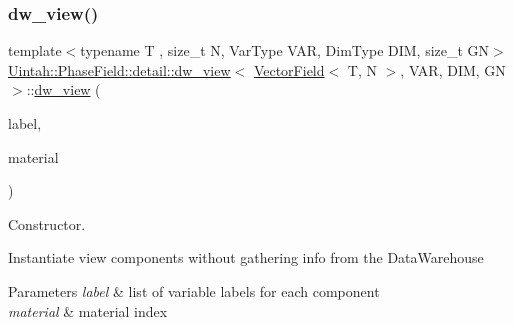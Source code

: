 \subsubsection{\texorpdfstring{dw\+\_\+view()}{dw\_view()}\hspace{0.1cm}{\footnotesize\ttfamily [1/3]}}
{\footnotesize\ttfamily template$<$typename T , size\+\_\+t N, Var\+Type V\+AR, Dim\+Type D\+IM, size\+\_\+t GN$>$ \\
\hyperlink{classUintah_1_1PhaseField_1_1detail_1_1dw__view}{Uintah\+::\+Phase\+Field\+::detail\+::dw\+\_\+view}$<$ \hyperlink{structUintah_1_1PhaseField_1_1VectorField}{Vector\+Field}$<$ T, N $>$, V\+AR, D\+IM, GN $>$\+::\hyperlink{classUintah_1_1PhaseField_1_1detail_1_1dw__view}{dw\+\_\+view} (\begin{DoxyParamCaption}\item[{const typename \hyperlink{structUintah_1_1PhaseField_1_1VectorField_a59698346336d8cdfdf767367839f2be9}{Field\+::label\+\_\+type} \&}]{label,  }\item[{int}]{material }\end{DoxyParamCaption})\hspace{0.3cm}{\ttfamily [inline]}}



Constructor. 

Instantiate view components without gathering info from the Data\+Warehouse


\begin{DoxyParams}{Parameters}
{\em label} & list of variable labels for each component \\
\hline
{\em material} & material index \\
\hline
\end{DoxyParams}
\mbox{\label{classUintah_1_1PhaseField_1_1detail_1_1dw__view_3_01VectorField_3_01T_00_01N_01_4_00_01VAR_00_01DIM_00_01GN_01_4_ab3fdf4520ef9422785a87063533e3d25}} 
